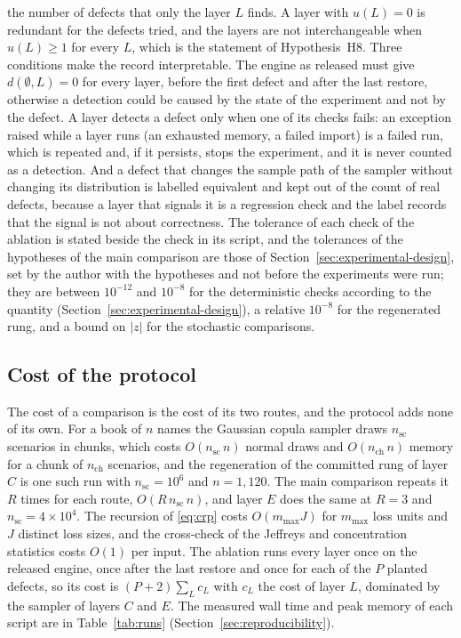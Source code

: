 the number of defects that only the layer $L$ finds. A layer with $u(L)=0$ is redundant for the defects tried, and the layers are not interchangeable when $u(L)\ge1$ for every $L$, which is the statement of Hypothesis~H8. Three conditions make the record interpretable. The engine as released must give $d(\emptyset,L)=0$ for every layer, before the first defect and after the last restore, otherwise a detection could be caused by the state of the experiment and not by the defect. A layer detects a defect only when one of its checks fails: an exception raised while a layer runs (an exhausted memory, a failed import) is a failed run, which is repeated and, if it persists, stops the experiment, and it is never counted as a detection. And a defect that changes the sample path of the sampler without changing its distribution is labelled equivalent and kept out of the count of real defects, because a layer that signals it is a regression check and the label records that the signal is not about correctness. The tolerance of each check of the ablation is stated beside the check in its script, and the tolerances of the hypotheses of the main comparison are those of Section~\ref{sec:experimental-design}, set by the author with the hypotheses and not before the experiments were run; they are between $10^{-12}$ and $10^{-8}$ for the deterministic checks according to the quantity (Section~\ref{sec:experimental-design}), a relative $10^{-8}$ for the regenerated rung, and a bound on $|z|$ for the stochastic comparisons.


\subsection{Cost of the protocol}

The cost of a comparison is the cost of its two routes, and the protocol adds none of its own. For a book of $n$ names the Gaussian copula sampler draws $n_{\mathrm{sc}}$ scenarios in chunks, which costs $O(n_{\mathrm{sc}}\,n)$ normal draws and $O(n_{\mathrm{ch}}\,n)$ memory for a chunk of $n_{\mathrm{ch}}$ scenarios, and the regeneration of the committed rung of layer $C$ is one such run with $n_{\mathrm{sc}}=10^6$ and $n=1{,}120$. The main comparison repeats it $R$ times for each route, $O(R\,n_{\mathrm{sc}}\,n)$, and layer $E$ does the same at $R=3$ and $n_{\mathrm{sc}}=4\times10^{4}$. The recursion of \eqref{eq:crp} costs $O(m_{\max}J)$ for $m_{\max}$ loss units and $J$ distinct loss sizes, and the cross-check of the Jeffreys and concentration statistics costs $O(1)$ per input. The ablation runs every layer once on the released engine, once after the last restore and once for each of the $P$ planted defects, so its cost is $(P+2)\sum_Lc_L$ with $c_L$ the cost of layer $L$, dominated by the sampler of layers $C$ and $E$. The measured wall time and peak memory of each script are in Table~\ref{tab:runs} (Section~\ref{sec:reproducibility}).
